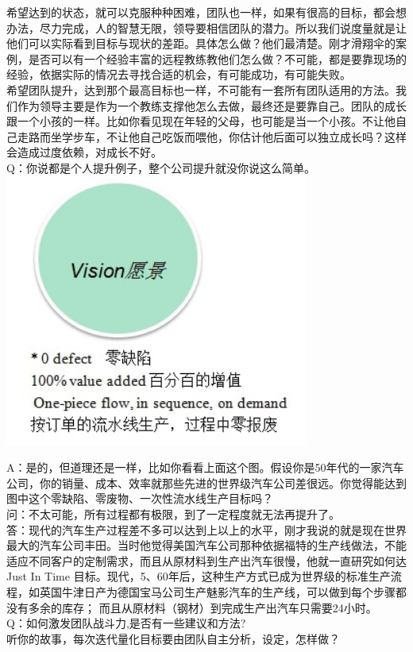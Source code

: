 希望达到的状态，就可以克服种种困难，团队也一样，如果有很高的目标，都会想办法，尽力完成，人的智慧无限，领导要相信团队的潜力。所以我们说度量就是让他们可以实际看到目标与现状的差距。具体怎么做？他们最清楚。刚才滑翔伞的案例，是否可以有一个经验丰富的远程教练教他们怎么做？不可能，都是要靠现场的经验，依据实际的情况去寻找合适的机会，有可能成功，有可能失败。\\
希望团队提升，达到那个最高目标也一样，不可能有一套所有团队适用的方法。我们作为领导主要是作为一个教练支撑他怎么去做，最终还是要靠自己。团队的成长跟一个小孩的一样。比如你看见现在年轻的父母，也可能是当一个小孩。不让他自己走路而坐学步车，不让他自己吃饭而喂他，你估计他后面可以独立成长吗？这样会造成过度依赖，对成长不好。\\
Q：你说都是个人提升例子，整个公司提升就没你说这么简单。\\

\includegraphics[width=10cm]{远景1.jpg}

A：是的，但道理还是一样，比如你看看上面这个图。假设你是50年代的一家汽车公司，你的销量、成本、效率就那些先进的世界级汽车公司差很远。你觉得能达到图中这个零缺陷、零废物、一次性流水线生产目标吗？\\
问：不太可能，所有过程都有极限，到了一定程度就无法再提升了。\\
答：现代的汽车生产过程差不多可以达到上以上的水平，刚才我说的就是现在世界最大的汽车公司丰田。当时他觉得美国汽车公司那种依据福特的生产线做法，不能适应不同客户的定制需求，而且从原材料到生产出汽车很慢，他就一直研究如何达
Just In Time
目标。现代，5、60年后，这种生产方式已成为世界级的标准生产流程，如英国牛津日产为德国宝马公司生产魅影汽车的生产线，可以做到每个步骤都没有多余的库存；
而且从原材料（钢材）到完成生产出汽车只需要24小时。\\
Q：如何激发团队战斗力,是否有一些建议和方法?\\
听你的故事，每次迭代量化目标要由团队自主分析，设定，怎样做？

